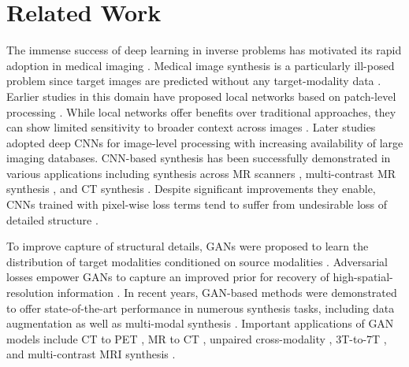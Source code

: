\documentclass[journal,twoside,web]{ieeecolor}
\begin{document}
\section{Related Work}
The immense success of deep learning in inverse problems has motivated its rapid adoption in medical imaging \cite{review_1,review_2}. Medical image synthesis is a particularly ill-posed problem since target images are predicted without any target-modality data \cite{nie2018}. Earlier studies in this domain have proposed local networks based on patch-level processing \cite{hien2015,li2014,torrado2016}. While local networks offer benefits over traditional approaches, they can show limited sensitivity to broader context across images \cite{sevetlidis2016}. Later studies adopted deep CNNs for image-level processing with increasing availability of large imaging databases. CNN-based synthesis has been successfully demonstrated in various applications including synthesis across MR scanners \cite{behrami2016,bahrami2016b,nie2018,zhang2019}, multi-contrast MR synthesis \cite{bowles2016,chartsias2018,cordier2016,sevetlidis2016,joyce2017,wei2019}, and CT synthesis \cite{han2017,nie2016,arabi2018,klaser2019}. Despite significant improvements they enable, CNNs trained with pixel-wise loss terms tend to suffer from undesirable loss of detailed structure \cite{pix2pix,cyclegan,pgan}. \par To improve capture of structural details, GANs \cite{gan} were proposed to learn the distribution of target modalities conditioned on source modalities \cite{conditionalgan}. Adversarial losses empower GANs to capture an improved prior for recovery of high-spatial-resolution information \cite{pix2pix,cyclegan,pgan}. In recent years, GAN-based methods were demonstrated to offer state-of-the-art performance in numerous synthesis tasks, including data augmentation as well as multi-modal synthesis \cite{sandfort2019,frida2018,pgan,lee2019}. Important applications of GAN models include CT to PET \cite{bencohen2018,santini2020}, MR to CT \cite{jin2018,ge2019,woltering2017}, unpaired cross-modality \cite{dong2019,yang2018,hiasa2018,chartsias2017}, 3T-to-7T \cite{huy2021,xiang2018}, and multi-contrast MRI synthesis \cite{armanious2019,beers2018,pgan,lan2020,lee2019,li2019,mmgan,wang2020,yang2021,yu2018,yu2019,yurt2021mustgan,zhou2020,nie2018}. 
\end{document}
